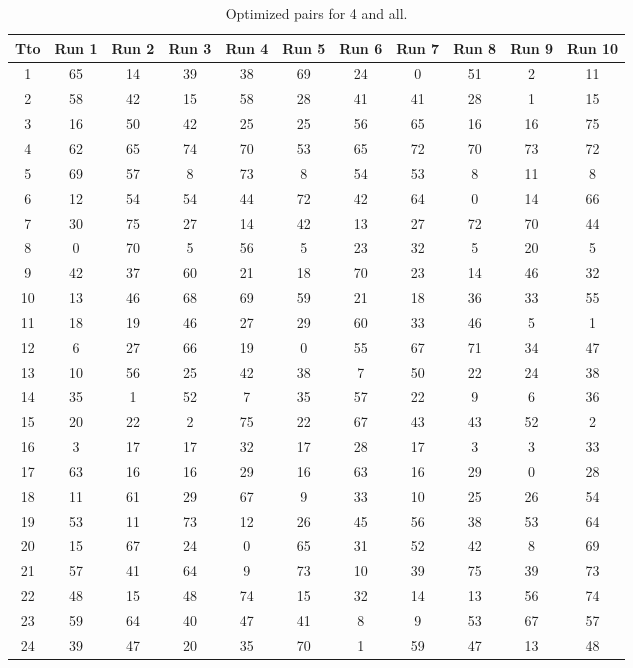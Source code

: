 \begin{table}
  \centering
  \scriptsize
  \caption{Optimized pairs for 4 and all.}
  \label{tab_pairs}
\begin{tabular}{c c c c c c c c c c c }
\hline
Tto & Run 1 & Run 2 & Run 3 & Run 4 & Run 5 & Run 6 & Run 7 & Run 8 & Run 9 & Run 10 \\
\hline
1 & 65 & 14 & 39 & 38 & 69 & 24 & 0 & 51 & 2 & 11 \\
2 & 58 & 42 & 15 & 58 & 28 & 41 & 41 & 28 & 1 & 15 \\
3 & 16 & 50 & 42 & 25 & 25 & 56 & 65 & 16 & 16 & 75 \\
4 & 62 & 65 & 74 & 70 & 53 & 65 & 72 & 70 & 73 & 72 \\
5 & 69 & 57 & 8 & 73 & 8 & 54 & 53 & 8 & 11 & 8 \\
6 & 12 & 54 & 54 & 44 & 72 & 42 & 64 & 0 & 14 & 66 \\
7 & 30 & 75 & 27 & 14 & 42 & 13 & 27 & 72 & 70 & 44 \\
8 & 0 & 70 & 5 & 56 & 5 & 23 & 32 & 5 & 20 & 5 \\
9 & 42 & 37 & 60 & 21 & 18 & 70 & 23 & 14 & 46 & 32 \\
10 & 13 & 46 & 68 & 69 & 59 & 21 & 18 & 36 & 33 & 55 \\
11 & 18 & 19 & 46 & 27 & 29 & 60 & 33 & 46 & 5 & 1 \\
12 & 6 & 27 & 66 & 19 & 0 & 55 & 67 & 71 & 34 & 47 \\
13 & 10 & 56 & 25 & 42 & 38 & 7 & 50 & 22 & 24 & 38 \\
14 & 35 & 1 & 52 & 7 & 35 & 57 & 22 & 9 & 6 & 36 \\
15 & 20 & 22 & 2 & 75 & 22 & 67 & 43 & 43 & 52 & 2 \\
16 & 3 & 17 & 17 & 32 & 17 & 28 & 17 & 3 & 3 & 33 \\
17 & 63 & 16 & 16 & 29 & 16 & 63 & 16 & 29 & 0 & 28 \\
18 & 11 & 61 & 29 & 67 & 9 & 33 & 10 & 25 & 26 & 54 \\
19 & 53 & 11 & 73 & 12 & 26 & 45 & 56 & 38 & 53 & 64 \\
20 & 15 & 67 & 24 & 0 & 65 & 31 & 52 & 42 & 8 & 69 \\
21 & 57 & 41 & 64 & 9 & 73 & 10 & 39 & 75 & 39 & 73 \\
22 & 48 & 15 & 48 & 74 & 15 & 32 & 14 & 13 & 56 & 74 \\
23 & 59 & 64 & 40 & 47 & 41 & 8 & 9 & 53 & 67 & 57 \\
24 & 39 & 47 & 20 & 35 & 70 & 1 & 59 & 47 & 13 & 48 \\

\end{tabular}
\end{table}
